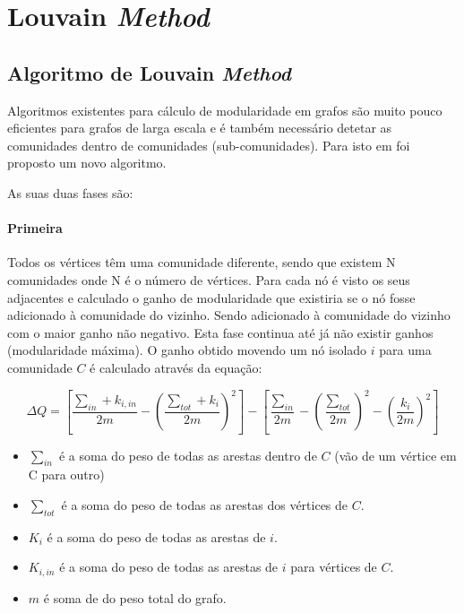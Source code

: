 
\renewcommand{\algorithmicrequire}{\textbf{Input: }}
\renewcommand{\algorithmicensure}{\textbf{Output: }}

\section{Louvain \textit{Method}}



\subsection{Algoritmo de Louvain \textit{Method}}
Algoritmos existentes para cálculo de modularidade em grafos são muito pouco eficientes para grafos de larga escala e é também necessário detetar as comunidades dentro de comunidades (sub-comunidades). Para isto em \cite{louvainDoc} foi proposto um novo algoritmo.

As suas duas fases são:

\paragraph{Primeira}
Todos os vértices têm uma comunidade diferente, sendo que existem N comunidades onde N é o número de vértices.
Para cada nó é visto os seus adjacentes e calculado o ganho de modularidade que existiria se o nó fosse adicionado à comunidade do vizinho. Sendo adicionado à comunidade do vizinho com o maior ganho não negativo. Esta fase continua até já não existir ganhos (modularidade máxima).
O ganho obtido movendo um nó isolado $i$ para uma comunidade $C$ é calculado através da equação:


\begin{equation}
\label{eq:GND}
 \Delta Q  =  [\frac{\sum_{in} + k_{i,in}}{2m} - (\frac{\sum_{tot} +k_i}{2m})^2] - [\frac{\sum_{in}}{2m} - (\frac{\sum_{tot}}{2m})^2 - (\frac{k_i}{2m})^2] 
\end{equation}

\begin{itemize}
	\item $\sum_{in}$ é a soma do peso de todas as arestas dentro de $C$ (vão de um vértice em C para outro)
	\item $\sum_{tot}$ é a soma do peso de todas as arestas dos vértices de $C$. %
	\item $K_i$ é a soma do peso de todas as arestas de $i$. %
	\item $K_{i,in}$ é a soma do peso de todas as arestas de $i$ para vértices de $C$.
	\item $m$ é soma de do peso total do grafo.
\end{itemize}


